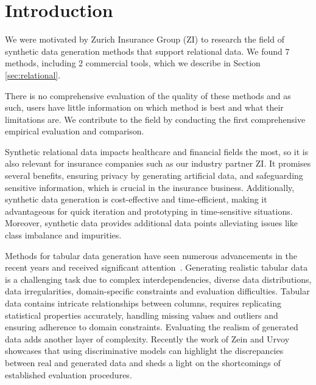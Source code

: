 \documentclass[fleqn,moreauthors,10pt]{ds_report}
\affiliation{\textit{Advisor: prof. dr. Erik Štrumbelj}}
\begin{document}
\flushbottom 

\maketitle 
\thispagestyle{empty} 


\section{Introduction}
We were motivated by Zurich Insurance Group (ZI) to research the field of synthetic data generation methods that support relational data. We found 7 methods, including 2 commercial tools, which we describe in Section \ref{sec:relational}. 

There is no comprehensive evaluation of the quality of these methods and as such, users have little information on which method is best and what their limitations are. We contribute to the field by conducting the first comprehensive empirical evaluation and comparison.

Synthetic relational data impacts healthcare and financial fields the most, so it is also relevant for insurance companies such as our industry partner ZI. It promises several benefits, ensuring privacy by generating artificial data, and safeguarding sensitive information, which is crucial in the insurance business. Additionally, synthetic data generation is cost-effective and time-efficient, making it advantageous for quick iteration and prototyping in time-sensitive situations. Moreover, synthetic data provides additional data points alleviating issues like class imbalance and impurities.

Methods for tabular data generation have seen numerous advancements in the recent years and received significant attention~\cite{Borisov_2022}. Generating realistic tabular data is a challenging task due to complex interdependencies, diverse data distributions, data irregularities, domain-specific constraints and evaluation difficulties. Tabular data contains intricate relationships between columns, requires replicating statistical properties accurately, handling missing values and outliers and ensuring adherence to domain constraints. Evaluating the realism of generated data adds another layer of complexity. Recently the work of Zein and Urvoy ~\cite{zein2022tabular} showcases that using discriminative models can highlight the discrepancies between real and generated data and sheds a light on the shortcomings of established evaluation procedures.
\end{document}
